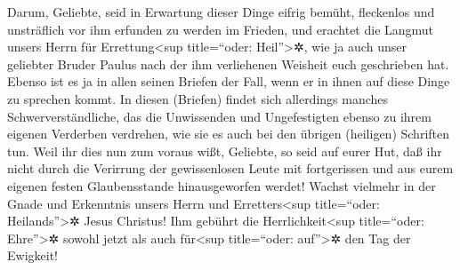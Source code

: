  Darum, Geliebte, seid in Erwartung dieser Dinge eifrig
bemüht, fleckenlos und unsträflich vor ihm erfunden zu werden im
Frieden,  und erachtet die Langmut unsers Herrn für
Errettung\textless sup title=``oder: Heil''\textgreater✲, wie ja auch
unser geliebter Bruder Paulus nach der ihm verliehenen Weisheit euch
geschrieben hat.  Ebenso ist es ja in allen seinen
Briefen der Fall, wenn er in ihnen auf diese Dinge zu sprechen kommt. In
diesen (Briefen) findet sich allerdings manches Schwerverständliche, das
die Unwissenden und Ungefestigten ebenso zu ihrem eigenen Verderben
verdrehen, wie sie es auch bei den übrigen (heiligen) Schriften tun.
 Weil ihr dies nun zum voraus wißt, Geliebte, so seid auf
eurer Hut, daß ihr nicht durch die Verirrung der gewissenlosen Leute mit
fortgerissen und aus eurem eigenen festen Glaubensstande hinausgeworfen
werdet!  Wachst vielmehr in der Gnade und Erkenntnis
unsers Herrn und Erretters\textless sup title=``oder:
Heilands''\textgreater✲ Jesus Christus! Ihm gebührt die
Herrlichkeit\textless sup title=``oder: Ehre''\textgreater✲ sowohl jetzt
als auch für\textless sup title=``oder: auf''\textgreater✲ den Tag der
Ewigkeit!
